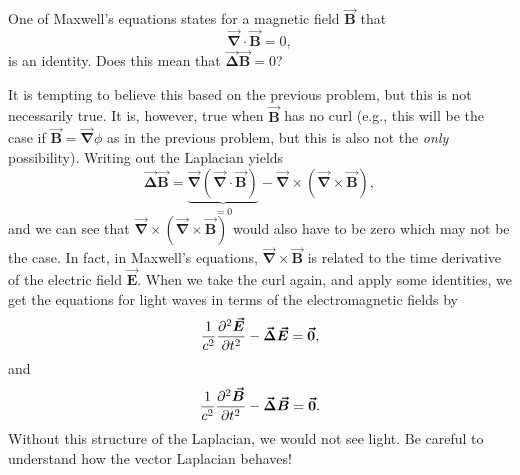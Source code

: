 \documentclass[12pt]{article} %
\newcommand{\grad}{\boldsymbol{\vec{\nabla}}}
\newcommand{\veclaplace}{\boldsymbol{\vec{\Delta}}}
\newcommand{\vecfieldB}{\boldsymbol{\vec{B}}}
\newcommand{\vecfieldE}{\boldsymbol{\vec{E}}}
\begin{document}
\newpage
\begin{problem}
    One of Maxwell's equations states for a magnetic field $\vecfieldB$ that
    \[
    \grad \cdot \vecfieldB = 0,
    \]
    is an identity.  Does this mean that $\veclaplace \vecfieldB = 0$? 
\end{problem}
\begin{solution}
    It is tempting to believe this based on the previous problem, but this is not necessarily true. It is, however, true when $\vecfieldB$ has no curl (e.g., this will be the case if $\vecfieldB = \grad \phi$ as in the previous problem, but this is also not the \emph{only} possibility).  Writing out the Laplacian yields   
    \[
    \veclaplace \vecfieldB = \underbrace{\grad(\grad \cdot \vecfieldB)}_{=0}- \grad \times (\grad \times \vecfieldB),
    \]
    and we can see that $\grad \times (\grad \times \vecfieldB)$ would also have to be zero which may not be the case. In fact, in Maxwell's equations, $\grad \times \vecfieldB$ is related to the time derivative of the electric field $\vecfieldE$. When we take the curl again, and apply some identities, we get the equations for light waves in terms of the electromagnetic fields by
    \[
        \frac{1}{c^2} \frac{\partial^2 \vecfieldE}{\partial t^2} - \veclaplace \vecfieldE = \zerovec,
    \]
    and
    \[
        \frac{1}{c^2} \frac{\partial^2 \vecfieldB}{\partial t^2} - \veclaplace \vecfieldB = \zerovec.
    \]
    Without this structure of the Laplacian, we would not see light. Be careful to understand how the vector Laplacian behaves!
\end{solution}
\end{document}
